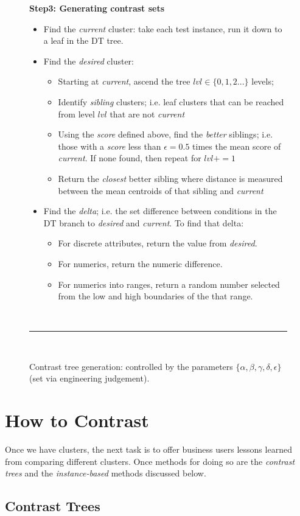 \documentclass[conference]{IEEEtran}
\newcommand{\bi}{\begin{itemize}}
\newcommand{\ei}{\end{itemize}}
\begin{document}
\begin{figure}[t]
		{\bf Step3: Generating contrast sets}
		\begin{itemize}
		\item Find the {\em current } cluster: take each test instance, run it down to a leaf in the DT tree.  
		\item Find the {\em desired} cluster: 
		\bi
		\item Starting at {\em current}, ascend the tree $lvl\in \{0,1,2...\}$ levels;
		\item Identify {\em sibling} clusters; i.e. leaf clusters that can be reached from level $lvl$ that are not {\em current }
		\item Using the {\em score} defined above, find the {\em better} siblings; i.e. those with a {\em score} less than $\epsilon=0.5$ times the mean score of {\em current}. If none found, then repeat for $lvl += 1$
		\item  Return the {\em closest} better sibling where distance is measured between the mean centroids of that sibling and {\em current}
		\ei
		\item Find the {\em delta}; i.e. the set difference between  conditions in the DT branch to {\em desired} and {\em current}. To find that delta:
		\bi
		\item
		For discrete attributes,  return the value from {\em desired}. 
		\item
		For  numerics, return the numeric difference. 
		\item
		For numerics  into ranges, return a random number selected from the low and high boundaries of the that range.
	\ei
	\ei
		~\hrule~
		\caption{Contrast tree generation: controlled by the parameters
		$\{\alpha, \beta, \gamma, \delta, \epsilon\}$ (set via engineering judgement).}
		\label{fig:contast_trees}
	\end{figure}
	
	\section{How to Contrast}
	Once we have  clusters, the next task is to offer business users lessons learned from comparing different clusters.
		Once methods for doing so are the {\em contrast trees} and the {\em instance-based}
		methods discussed below.
	
		\subsection{ Contrast Trees}
\end{document}
